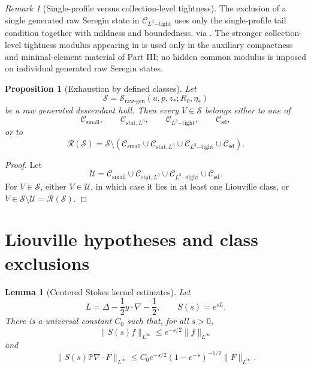 \documentclass[11pt]{amsart}
\theoremstyle{plain}
\newtheorem{lemma}[lemma]{Lemma}
\newtheorem{proposition}[proposition]{Proposition}
\theoremstyle{definition}
\theoremstyle{remark}
\newtheorem{remark}[remark]{Remark}
\numberwithin{equation}{section}
\newcommand{\calS}{\mathcal S}
\newcommand{\calR}{\mathcal R}
\newcommand{\calC}{\mathcal C}
\newcommand{\calU}{\mathcal U}
\begin{document}
\begin{remark}[Single-profile versus collection-level tightness]
\label{p1:rem:single-vs-collection}
The exclusion of a single generated raw Seregin state in
\(\calC_{L^3\mathrm{-tight}}\) uses only the single-profile tail condition
together with mildness and boundedness, via .  The stronger
collection-level tightness modulus appearing in
 is used only in the
auxiliary compactness and minimal-element material of Part III; no hidden common
modulus is imposed on individual generated raw Seregin states.
\end{remark}

\begin{proposition}[Exhaustion by defined classes]\label{p1:prop:exhaustion}
Let
\[
   \calS=\calS_{\mathrm{raw\text{-}gen}}(u,p,z_*;R_0,\eta_*)
\]
be a raw generated descendant hull.  Then every \(V\in\calS\) belongs either to
one of
\[
   \calC_{\mathrm{small}},\qquad
   \calC_{\mathrm{stat},L^3},\qquad
   \calC_{L^3\mathrm{-tight}},\qquad
   \calC_{\mathrm{sd}},
\]
or to
\[
   \calR(\calS)
   =
   \calS
   \setminus
   \left(
      \calC_{\mathrm{small}}
      \cup
      \calC_{\mathrm{stat},L^3}
      \cup
      \calC_{L^3\mathrm{-tight}}
      \cup
      \calC_{\mathrm{sd}}
   \right).
\]
\end{proposition}

\begin{proof}
Let
\[
   \calU=
      \calC_{\mathrm{small}}
      \cup
      \calC_{\mathrm{stat},L^3}
      \cup
      \calC_{L^3\mathrm{-tight}}
      \cup
      \calC_{\mathrm{sd}}.
\]
For \(V\in\calS\), either \(V\in\calU\), in which case it lies in at least one
Liouville class, or \(V\in\calS\setminus\calU=\calR(\calS)\).
\end{proof}

\section{Liouville hypotheses and class exclusions}\label{p1:sec:liouville}

\begin{lemma}[Centered Stokes kernel estimates]
\label{p1:lem:centered-stokes-estimates}
Let
\[
   L=\Delta-\frac12y\cdot\nabla-\frac12,
   \qquad S(s)=e^{sL}.
\]
There is a universal constant \(C_0\) such that, for all \(s>0\),
\[
   \|S(s)f\|_{L^\infty}\le e^{-s/2}\|f\|_{L^\infty}
\]
and
\[
   \|S(s)\mathbb P\nabla\cdot F\|_{L^\infty}
   \le C_0 e^{-s/2}(1-e^{-s})^{-1/2}\|F\|_{L^\infty}.
\]
\end{lemma}
\end{document}
